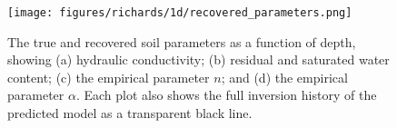 \begin{figure}[ht]
\begin{center}
\texttt{[image: figures/richards/1d/recovered\_parameters.png]}
\end{center}
\caption{
The true and recovered soil parameters as a function of depth, showing (a) hydraulic conductivity; (b) residual and saturated water content; (c) the empirical parameter $n$; and (d) the empirical parameter $\alpha$. Each plot also shows the full inversion history of the predicted model as a transparent black line.
}
\label{fig:richards-1d-recovered_parameters}
\end{figure}
